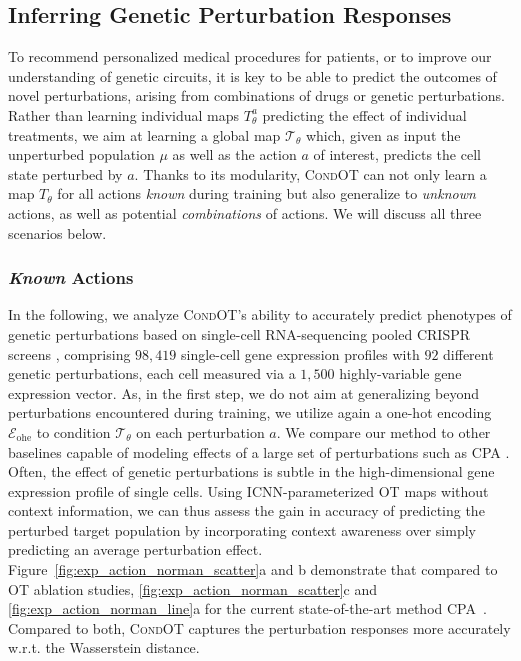 \subsection{Inferring Genetic Perturbation Responses}

 To recommend personalized medical procedures for patients, or to improve our understanding of genetic circuits, it is key to be able to predict the outcomes of novel perturbations, arising from combinations of drugs or genetic perturbations. 
Rather than learning individual maps $T_\theta^a$ predicting the effect of individual treatments, we aim at learning a global map  $\mathcal{T}_\theta$ which, given as input the unperturbed population $\mu$ as well as the action $a$ of interest, predicts the cell state perturbed by $a$.
Thanks to its modularity, \textsc{CondOT} can not only learn a map $T_\theta$ for all actions \emph{known} during training but also generalize to \emph{unknown} actions, as well as potential \emph{combinations} of actions. We will discuss all three scenarios below.

\subsubsection{\textit{Known} Actions}
\label{sec:eval_action_known}

 In the following, we analyze \textsc{CondOT}'s ability to accurately predict phenotypes of genetic perturbations based on single-cell RNA-sequencing pooled \acrfull{CRISPR} screens \citep{norman2019exploring, dixit2016perturb}, comprising $98,419$ single-cell gene expression profiles with $92$ different genetic perturbations, each cell measured via a $1,500$ highly-variable gene expression vector.
As, in the first step, we do not aim at generalizing beyond perturbations encountered during training, we utilize again a one-hot encoding $\mathcal{E}_\text{ohe}$ to condition $\mathcal{T}_\theta$ on each perturbation $a$.
We compare our method to other baselines capable of modeling effects of a large set of perturbations such as \textsc{CPA} \citep{lotfollahi2021compositional}.
Often, the effect of genetic perturbations is subtle in the high-dimensional gene expression profile of single cells. Using ICNN-parameterized OT maps without context information, we can thus assess the gain in accuracy of predicting the perturbed target population by incorporating context awareness over simply predicting an average perturbation effect. 
Figure~\ref{fig:exp_action_norman_scatter}a and b demonstrate that compared to OT ablation studies, \cref{fig:exp_action_norman_scatter}c and \cref{fig:exp_action_norman_line}a for the current state-of-the-art method \textsc{CPA}~\citep{lotfollahi2021compositional}. Compared to both, \textsc{CondOT} captures the perturbation responses more accurately w.r.t. the Wasserstein distance.

